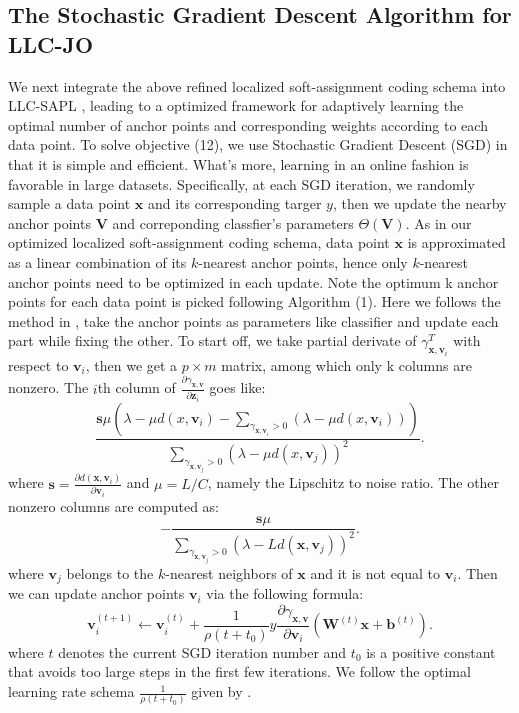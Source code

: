 \documentclass{llncs}
\def \x {\mathbf{x}}
\def \W {\mathbf{W}}
\def \v {\mathbf{v}}
\def \V {\mathbf{V}}
\def \z {\mathbf{z}}
\def \b {\mathbf{b}}
\def \s {\mathbf{s}}
\begin{document}
	\subsection{The Stochastic Gradient Descent Algorithm for LLC-JO}
	We next integrate the above refined localized soft-assignment coding schema into LLC-SAPL \cite{4}, leading to a optimized framework for adaptively learning the optimal number of anchor points and corresponding weights according to each data point. To solve objective (12), we use Stochastic Gradient Descent (SGD) in that it is simple and efficient. What's more, learning in an online fashion is favorable in large datasets. Specifically, at each SGD iteration, we randomly sample a data point $\x$ and its corresponding targer $y$, then we update the nearby anchor points $\V$ and correponding classfier's parameters $\Theta(\V)$. As in our optimized localized soft-assignment coding schema, data point $\x$ is approximated as a linear combination of its $k$-nearest anchor points, hence only $k$-nearest anchor points need to be optimized in each update. Note the optimum k anchor points for each data point is picked following Algorithm (1). Here we follows the method in \cite{4}, take the anchor points as parameters like classifier and update each part while fixing the other. To start off, we take partial derivate of $\gamma_{\x,\v_i}^T$ with respect to $\v_i$, then we get a $p\times m$ matrix, among which only k columns are nonzero. The $i$th column of $\frac{\partial\gamma_{\x,\v}}{\partial\z_i}$ goes like:
	\begin{equation}
	\frac{\s\mu(\lambda-\mu d(x,\v_i)-\sum_{\gamma_{\x,\v_i}>0}(\lambda-\mu d(x,\v_i)))}{\sum_{\gamma_{\x,\v_j}>0}(\lambda-\mu d(x,\v_j))^2}.
	\end{equation}
	where $\s = \frac{\partial d(\x,\v_i)}{\partial \v_i}$ and $\mu = L/C$, namely the Lipschitz to noise ratio. The other nonzero columns are computed as:
	\begin{equation}
	-\frac{\s\mu}{\sum_{\gamma_{\x,\v_j}>0}(\lambda-Ld(\x,\v_j))^2}.
	\end{equation}
	where $\v_j$ belongs to the $k$-nearest neighbors of $\x$ and it is not equal to $\v_i$. Then we can update anchor points $\v_i$ via the following formula:
	\begin{equation}
	\v_i^{(t+1)} \leftarrow \v_i^{(t)} + \frac{1}{\rho(t+t_0)}y\frac{\partial \gamma_{\x,\v}}{\partial \v_i}(\W^{(t)}\x + \b^{(t)}).
	\end{equation}
	where $t$ denotes the current SGD iteration number and $t_0$ is a positive constant that avoids too large steps in the first few iterations. We follow the optimal learning rate schema $\frac{1}{\rho(t+t_0)}$ given by \cite{13} \cite{14}.
\end{document}
